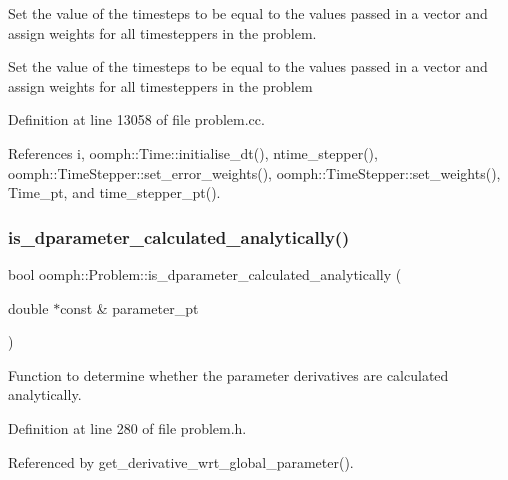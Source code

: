 Set the value of the timesteps to be equal to the values passed in a vector and assign weights for all timesteppers in the problem. 

Set the value of the timesteps to be equal to the values passed in a vector and assign weights for all timesteppers in the problem 

Definition at line 13058 of file problem.\+cc.



References i, oomph\+::\+Time\+::initialise\+\_\+dt(), ntime\+\_\+stepper(), oomph\+::\+Time\+Stepper\+::set\+\_\+error\+\_\+weights(), oomph\+::\+Time\+Stepper\+::set\+\_\+weights(), Time\+\_\+pt, and time\+\_\+stepper\+\_\+pt().

\mbox{\label{classoomph_1_1Problem_a41a7b9cf8e6fe1156fc92baa43c3fe4b}} 
\subsubsection{\texorpdfstring{is\+\_\+dparameter\+\_\+calculated\+\_\+analytically()}{is\_dparameter\_calculated\_analytically()}}
{\footnotesize\ttfamily bool oomph\+::\+Problem\+::is\+\_\+dparameter\+\_\+calculated\+\_\+analytically (\begin{DoxyParamCaption}\item[{double $\ast$const \&}]{parameter\+\_\+pt }\end{DoxyParamCaption})\hspace{0.3cm}{\ttfamily [inline]}}



Function to determine whether the parameter derivatives are calculated analytically. 



Definition at line 280 of file problem.\+h.



Referenced by get\+\_\+derivative\+\_\+wrt\+\_\+global\+\_\+parameter().

\mbox{\label{classoomph_1_1Problem_a5c864f0dfc4f0ff33e07935944b7b435}} 
